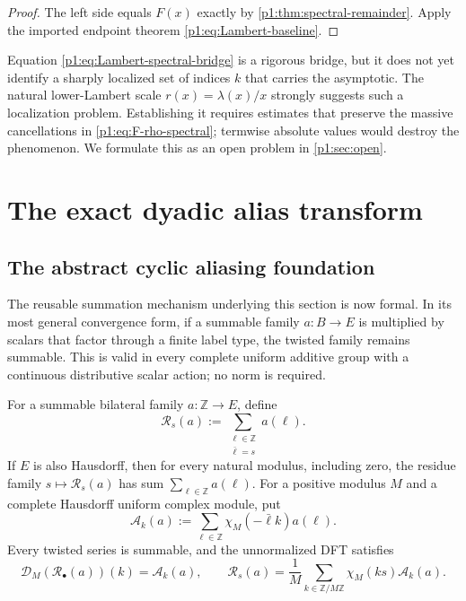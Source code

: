 \documentclass[11pt,oneside]{article}
\theoremstyle{definition}
\theoremstyle{remark}
\newcommand{\Z}{\mathbb Z}
\begin{document}
\begin{proof}
The left side equals $F(x)$ exactly by
\cref{p1:thm:spectral-remainder}.  Apply the imported endpoint theorem
\eqref{p1:eq:Lambert-baseline}.
\end{proof}

\begin{remark}
Equation \eqref{p1:eq:Lambert-spectral-bridge} is a rigorous bridge, but it does not
yet identify a sharply localized set of indices $k$ that carries the asymptotic.
The natural lower-Lambert scale $r(x)=\lambda(x)/x$ strongly suggests such a
localization problem.  Establishing it requires estimates that preserve the
massive cancellations in \eqref{p1:eq:F-rho-spectral}; termwise absolute values
would destroy the phenomenon.  We formulate this as an open problem in
\cref{p1:sec:open}.
\end{remark}

\section{The exact dyadic alias transform}\label{p1:sec:dct}

\subsection{The abstract cyclic aliasing foundation}

The reusable summation mechanism underlying this section is now formal.  In
its most general convergence form, if a summable family \(a:B\to E\) is
multiplied by scalars that factor through a finite label type, the twisted
family remains summable.  This is valid in every complete uniform additive
group with a continuous distributive scalar action; no norm is required.

For a summable bilateral family \(a:\Z\to E\), define
\[
 \mathcal R_s(a):=\sum_{\substack{\ell\in\Z\\\bar\ell=s}}a(\ell).
\]
If \(E\) is also Hausdorff, then for every natural modulus, including zero,
the residue family
\(s\mapsto\mathcal R_s(a)\) has sum \(\sum_{\ell\in\Z}a(\ell)\).
For a positive modulus \(M\) and a complete Hausdorff uniform complex
module, put
\[
 \mathcal A_k(a):=
 \sum_{\ell\in\Z}\chi_M(-\bar\ell k)a(\ell).
\]
Every twisted series is summable, and the unnormalized DFT satisfies
\[
 \mathcal D_M(\mathcal R_\bullet(a))(k)=\mathcal A_k(a),
 \qquad
 \mathcal R_s(a)=\frac1M\sum_{k\in\Z/M\Z}
   \chi_M(ks)\mathcal A_k(a).
\]
\end{document}
